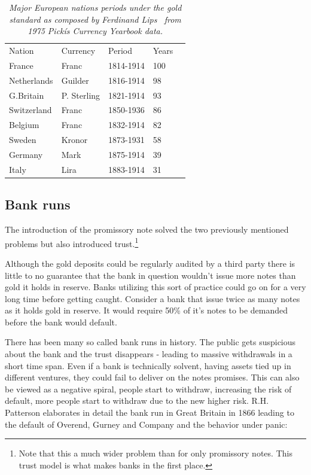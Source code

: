 \begin{table}[!htb]
	\begin{tabular}{lllll}
		Nation & Currency & Period & Years \\
		France & Franc & 1814-1914 & 100 \\
		Netherlands & Guilder & 1816-1914 & 98 \\
		G.Britain & P. Sterling & 1821-1914 & 93 \\
		Switzerland & Franc & 1850-1936 & 86 \\
		Belgium & Franc & 1832-1914 & 82 \\
		Sweden & Kronor & 1873-1931 & 58 \\
		Germany & Mark & 1875-1914 & 39 \\
		Italy & Lira & 1883-1914 & 31 \\   
	\end{tabular}

	\caption{\textit{ Major European nations periods under the gold standard
			as composed by Ferdinand Lips~\cite{lips:gold:wars} from 1975 Pickís Currency Yearbook data.
	}}
	\label{tab:gold:standard}
\end{table}

\subsection{Bank runs}

The introduction of the promissory note solved the two previously mentioned problems but also 
introduced trust.\footnote{Note that this a much wider problem than for only promissory notes. This trust model is what makes banks in the first place.} 

Although the gold deposits could be regularly audited by a third party there is little to no guarantee that the bank in question wouldn't issue more notes than gold it holds in reserve. Banks utilizing this sort of practice could go on for a very long time before getting caught. Consider a bank that issue twice as many notes as it holds gold in reserve. It would require 50\% of it's notes to be demanded before the bank would default.  
  
There has been many so called bank runs in history. The public gets suspicious about the bank and the trust disappears - leading to massive withdrawals in a short time span. Even if a bank is technically solvent, having assets tied up in different ventures, they could fail to deliver on the notes promises. This can also be viewed as a negative spiral, people start to withdraw, increasing the risk of default, more people start to withdraw due to the new higher risk. R.H. Patterson elaborates in detail the bank run in Great Britain in 1866 leading to the default of Overend, Gurney and Company and the behavior under panic: 

